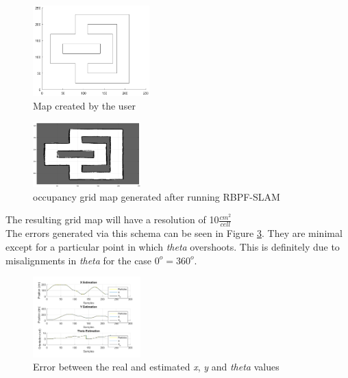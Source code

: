 \documentclass[letterpaper]{article}
\begin{document}
\begin{figure}[h]
	\centering
	\includegraphics[width=0.4\textwidth]{figures/initial_map}
	\caption{Map created by the user}
	\label{initial_map}
\end{figure}
\begin{figure}[h]
	\centering
	\includegraphics[width=0.37\textwidth]{figures/end_map}
	\caption{occupancy grid map generated after running RBPF-SLAM}
	\label{end_map}
\end{figure}

The resulting grid map will have a resolution of 10$\frac{cm^2}{cell}$ \\

The errors generated via this schema can be seen in Figure \ref{error_estimation}. They are minimal except for a particular point in which \textit{theta} overshoots. This is definitely due to misalignments in \textit{theta} for the case $0^o = 360^o$.

\begin{figure}[h]
	\centering
	\includegraphics[width=0.37\textwidth]{figures/error_estimation}
	\caption{Error between the real and estimated \textit{x}, \textit{y} and \textit{theta} values}
	\label{error_estimation}
\end{figure}



\end{document}
